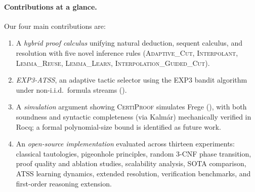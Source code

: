 \documentclass[acmtocl,review,anonymous]{acmart}
\newcommand{\CP}{\textsc{CertiProof}}
\begin{document}
\paragraph{Contributions at a glance.}
Our four main contributions are:
\begin{enumerate}
  \item A \emph{hybrid proof calculus} unifying natural deduction,
    sequent calculus, and resolution with five novel inference rules
    (\textsc{Adaptive\_Cut}, \textsc{Interpolant},
    \textsc{Lemma\_Reuse}, \textsc{Lemma\_Learn},
    \textsc{Interpolation\_Guided\_Cut}).
  \item \emph{EXP3-ATSS}, an adaptive tactic selector using the EXP3
    bandit algorithm~\cite{AuerCesaBianchiFreundSchapire2002} under
    non-i.i.d.\ formula streams ().
  \item A \emph{simulation} argument showing \CP{} simulates Frege
    (), with both soundness and syntactic
    completeness (via Kalm\'{a}r) mechanically verified in Rocq; a
    formal polynomial-size bound is identified as future work.
  \item An \emph{open-source implementation} evaluated across thirteen
    experiments: classical tautologies, pigeonhole principles, random
    3-CNF phase transition, proof quality and ablation studies,
    scalability analysis, SOTA comparison, ATSS learning dynamics,
    extended resolution, verification benchmarks, and first-order
    reasoning extension.
\end{enumerate}
\end{document}
